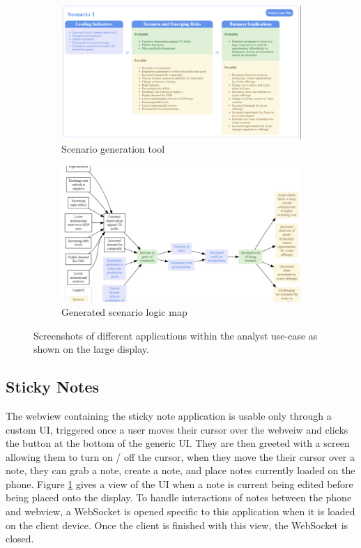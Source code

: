 \begin{figure}[bt]
\vspace{0.5cm}

\begin{subfigure}[b]{.45\linewidth}
\includegraphics[width=\linewidth]{chapters/04_muifold/figures/scenario_planner.png}
\caption{Scenario generation tool}
\end{subfigure}
\begin{subfigure}[b]{.45\linewidth}
\includegraphics[width=\linewidth]{chapters/04_muifold/figures/scenario_planner_map.png}
\caption{Generated scenario logic map} 
\end{subfigure}
\caption{Screenshots of different applications within the analyst use-case as shown on the large display.}
\label{fig:muifold_use_case_grid}
\end{figure}

\subsection{Sticky Notes}

The webview containing the sticky note application is usable only
through a custom UI, triggered once a user moves their cursor
over the webveiw and clicks the button at the bottom of the generic
UI. They are then greeted with a screen allowing them to turn on / off
the cursor, when they move the their cursor over a note, they can
grab a note, create a note, and place notes currently loaded on the
phone. Figure \ref{fig:muifold_use_case_grid} gives a view of the
UI when a note is current being edited before being placed onto the
display. To handle interactions of notes between the phone and
webview, a WebSocket is opened specific to this application when
it is loaded on the client device. Once the client is finished with
this view, the WebSocket is closed.

